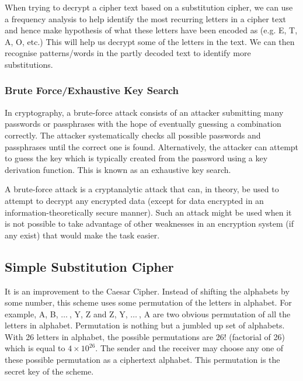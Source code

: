 \documentclass[british]{article}
\begin{document}
When trying to decrypt a cipher text based on a substitution cipher,
we can use a frequency analysis to help identify the most recurring
letters in a cipher text and hence make hypothesis of what these letters
have been encoded as (e.g. E, T, A, O, etc.) This will help us decrypt
some of the letters in the text. We can then recognise patterns/words
in the partly decoded text to identify more substitutions.

\subsubsection{Brute Force/Exhaustive Key Search}

In cryptography, a brute-force attack consists of an attacker submitting
many passwords or passphrases with the hope of eventually guessing
a combination correctly. The attacker systematically checks all possible
passwords and passphrases until the correct one is found. Alternatively,
the attacker can attempt to guess the key which is typically created
from the password using a key derivation function. This is known as
an exhaustive key search.

A brute-force attack is a cryptanalytic attack that can, in theory,
be used to attempt to decrypt any encrypted data (except for data
encrypted in an information-theoretically secure manner). Such an
attack might be used when it is not possible to take advantage of
other weaknesses in an encryption system (if any exist) that would
make the task easier.

\pagebreak{}

\subsection{Simple Substitution Cipher}

It is an improvement to the Caesar Cipher. Instead of shifting the
alphabets by some number, this scheme uses some permutation of the
letters in alphabet. For example, A, B, $\ldots\:$, Y, Z and Z, Y,
$\ldots\:$, A are two obvious permutation of all the letters in alphabet.
Permutation is nothing but a jumbled up set of alphabets. With 26
letters in alphabet, the possible permutations are 26! (factorial
of 26) which is equal to $4\times10^{26}$. The sender and the receiver
may choose any one of these possible permutation as a ciphertext alphabet.
This permutation is the secret key of the scheme.
\end{document}
